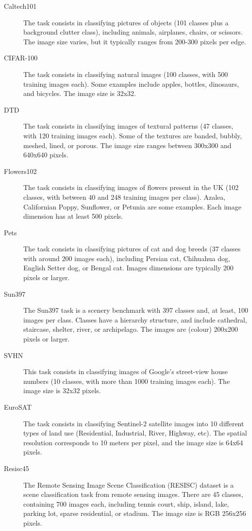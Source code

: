 \documentclass{article}
\begin{document}
\begin{description}
    \item[Caltech101] \citep{li2006one} The task consists in classifying pictures of objects (101 classes plus a background clutter class), including animals, airplanes, chairs, or scissors. The image size varies, but it typically ranges from 200-300 pixels per edge.
    \item[CIFAR-100] \citep{cifar10}  The task consists in classifying natural images (100 classes, with 500 training images each). Some examples include apples, bottles, dinosaurs, and bicycles.
    The image size is 32x32.
    \item[DTD] \citep{cimpoi14describing} The task consists in classifying images of textural patterns (47 classes, with 120 training images each). Some of the textures are banded, bubbly, meshed, lined, or porous.
    The image size ranges between 300x300 and 640x640 pixels.
    \item[Flowers102] \citep{Nilsback08} The task consists in classifying images of flowers present in the UK (102 classes, with between 40 and 248 training images per class). Azalea, Californian Poppy, Sunflower, or Petunia are some examples.
    Each image dimension has at least 500 pixels.
    \item[Pets] \citep{parkhi12a} The task consists in classifying pictures of cat and dog breeds (37 classes with around 200 images each), including Persian cat, Chihuahua dog, English Setter dog, or Bengal cat. Images dimensions are typically 200 pixels or larger.
    \item[Sun397] \citep{xiao2010sun} The Sun397 task is a scenery benchmark with 397 classes and, at least, 100 images per class. Classes have a hierarchy structure, and include cathedral, staircase, shelter, river, or archipelago. The images are (colour) 200x200 pixels or larger.
    \item[SVHN] \citep{netzer2011reading} This task consists in classifying images of Google's street-view house numbers (10 classes, with more than 1000 training images each).
    The image size is 32x32 pixels.
    \item[EuroSAT] \citep{helber2017eurosat} The task consists in classifying Sentinel-2 satellite images into 10 different types of land use (Residential, Industrial, River, Highway, etc). The spatial resolution corresponds to 10 meters per pixel, and the image size is 64x64 pixels.
    \item[Resisc45] \citep{cheng2017remote} The Remote Sensing Image Scene Classification (RESISC) dataset is a scene classification task from remote sensing images. There are 45 classes, containing 700 images each, including tennis court, ship, island, lake, parking lot, sparse residential, or stadium. The image size is RGB 256x256 pixels.

\end{description}
\end{document}
